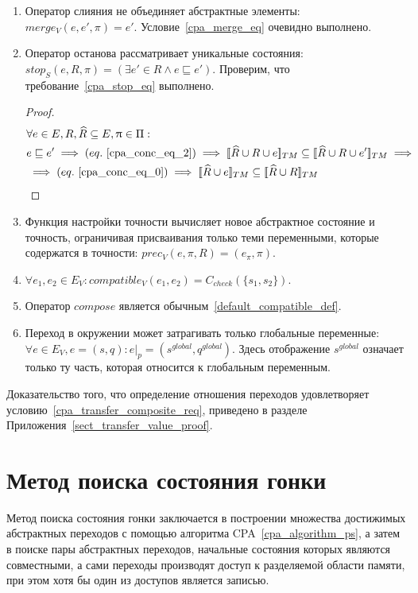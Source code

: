 \begin{enumerate}
\item Оператор слияния не объединяет абстрактные элементы: $merge_V(e, e', \pi) = e'$. Условие~\ref{cpa_merge_eq} очевидно выполнено.

\item Оператор останова рассматривает уникальные состояния: $stop_S(e, R, \pi) = (\exists e' \in R \land e \sqsubseteq e')$.
Проверим, что требование~\ref{cpa_stop_eq} выполнено.
\begin{proof}
\begin{align*}
&\forall e \in E, R, \widehat{R} \subseteq E, \pi \in \Pi: \\
& e \sqsubseteq e' \implies (eq.~\ref{cpa_conc_eq_2}) \implies \conctm{\widehat{R} \cup R \cup e} \subseteq \conctm{\widehat{R} \cup R \cup e'} \implies \\
& \implies (eq.~\ref{cpa_conc_eq_0}) \implies \conctm{\widehat{R} \cup e} \subseteq \conctm{\widehat{R} \cup R} 
\end{align*}
\end{proof}

\item Функция настройки точности вычисляет новое абстрактное состояние и точность, ограничивая присваивания только теми переменными, которые содержатся в точности: $prec_V(e, \pi, R) = (e_{\pi}, \pi)$.

\item $\forall e_1, e_2 \in E_V: compatible_V(e_1,e_2) = C_{check}(\{s_1, s_2\})$.

\item Оператор $compose$ является обычным~\ref{default_compatible_def}.

\item Переход в окружении может затрагивать только глобальные переменные: $\forall e \in E_V, e=(s,q):e|_p=(s^{global},q^{global})$.
 Здесь отображение $s^{global}$ означает только ту часть, которая относится к глобальным переменным.
\end{enumerate}

Доказательство того, что определение отношения переходов удовлетворяет условию~\ref{cpa_transfer_composite_req}, приведено в разделе Приложения~\ref{sect_transfer_value_proof}. 

\section{Метод поиска состояния гонки}
\label{sect_race_theory}

Метод поиска состояния гонки заключается в построении множества достижимых абстрактных переходов с помощью алгоритма CPA~\ref{cpa_algorithm_ps}, а затем в поиске пары абстрактных переходов, начальные состояния которых являются совместными, а сами переходы производят доступ к разделяемой области памяти, при этом хотя бы один из доступов является записью.

